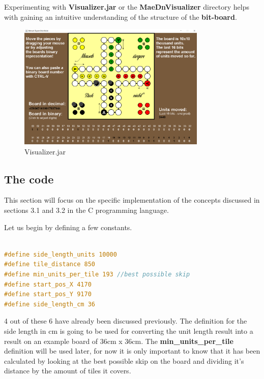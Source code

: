 \documentclass[12pt]{article}
\begin{document}
Experimenting with \textbf{Visualizer.jar} or the \textbf{MaeDnVisualizer} directory helps with gaining an intuitive understanding of the structure of the \textbf{bit-board}.

\begin{figure}[htbp]
    \centering
    \includegraphics[width=0.8\textwidth]{images/Figure6}
    \caption{Visualizer.jar}
    \label{fig:visualizer}
\end{figure}

\newpage

\subsection{The code}

This section will focus on the specific implementation of the concepts discussed in sections 3.1 and 3.2 in the C programming language.

Let us begin by defining a few constants.

\begin{lstlisting}[language=C, caption={Distance definitions}, label={lst:distance-defs}]

#define side_length_units 10000
#define tile_distance 850
#define min_units_per_tile 193 //best possible skip
#define start_pos_X 4170
#define start_pos_Y 9170
#define side_length_cm 36

\end{lstlisting}

4 out of these 6 have already been discussed previously. The definition for the side length in cm is going to be used for converting the unit length result into a result on an example board of 36cm x 36cm. The \textbf{min\_units\_per\_tile} definition will be used later, for now it is only important to know that it has been calculated by looking at the best possible skip on the board and dividing it's distance by the amount of tiles it covers.
\end{document}
